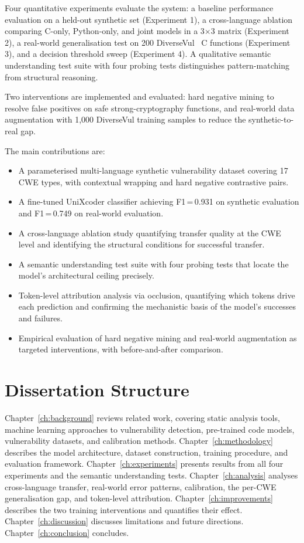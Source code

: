 Four quantitative experiments evaluate the system: a baseline performance evaluation on
a held-out synthetic set (Experiment 1), a cross-language ablation comparing C-only,
Python-only, and joint models in a 3$\times$3 matrix (Experiment 2), a real-world
generalisation test on 200 DiverseVul~\cite{ni2023diversevul} C functions
(Experiment 3), and a decision threshold sweep (Experiment 4).
A qualitative semantic understanding test suite with four probing tests distinguishes
pattern-matching from structural reasoning.

Two interventions are implemented and evaluated: hard negative mining to resolve
false positives on safe strong-cryptography functions, and real-world data augmentation
with 1{,}000 DiverseVul training samples to reduce the synthetic-to-real gap.

The main contributions are:
\begin{itemize}
  \item A parameterised multi-language synthetic vulnerability dataset covering 17 CWE types,
        with contextual wrapping and hard negative contrastive pairs.
  \item A fine-tuned UniXcoder classifier achieving F1\,=\,0.931 on synthetic evaluation
        and F1\,=\,0.749 on real-world evaluation.
  \item A cross-language ablation study quantifying transfer quality at the CWE level and
        identifying the structural conditions for successful transfer.
  \item A semantic understanding test suite with four probing tests that locate the model's
        architectural ceiling precisely.
  \item Token-level attribution analysis via occlusion, quantifying which tokens drive each
        prediction and confirming the mechanistic basis of the model's successes and failures.
  \item Empirical evaluation of hard negative mining and real-world augmentation as targeted
        interventions, with before-and-after comparison.
\end{itemize}

\section{Dissertation Structure}

Chapter~\ref{ch:background} reviews related work, covering static analysis tools,
machine learning approaches to vulnerability detection, pre-trained code models,
vulnerability datasets, and calibration methods.
Chapter~\ref{ch:methodology} describes the model architecture, dataset construction,
training procedure, and evaluation framework.
Chapter~\ref{ch:experiments} presents results from all four experiments and the
semantic understanding tests.
Chapter~\ref{ch:analysis} analyses cross-language transfer, real-world error patterns,
calibration, the per-CWE generalisation gap, and token-level attribution.
Chapter~\ref{ch:improvements} describes the two training interventions and quantifies
their effect.
Chapter~\ref{ch:discussion} discusses limitations and future directions.
Chapter~\ref{ch:conclusion} concludes.
